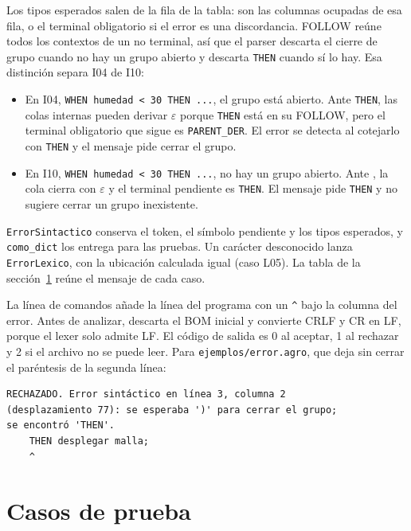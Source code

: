 \documentclass[11pt,a4paper]{article}
\newcommand{\tk}[1]{\texttt{#1}}
\begin{document}
Los tipos esperados salen de la fila de la tabla: son las columnas
ocupadas de esa fila, o el terminal obligatorio si el error es una
discordancia. FOLLOW reúne todos los contextos de un no terminal,
así que el parser descarta el cierre de grupo cuando no hay un
grupo abierto y descarta \tk{THEN} cuando sí lo hay. Esa distinción
separa I04 de I10:

\begin{itemize}
  \item En I04, \texttt{WHEN humedad < 30 THEN ...}, el grupo está
    abierto. Ante \tk{THEN}, las colas internas pueden derivar
    $\varepsilon$ porque \tk{THEN} está en su FOLLOW, pero el
    terminal obligatorio que sigue es \tk{PARENT\_DER}. El error
    se detecta al cotejarlo con \tk{THEN} y el mensaje pide cerrar el grupo.
  \item En I10, \texttt{WHEN humedad < 30 THEN ...}, no hay un grupo
    abierto. Ante \tk{}, la cola cierra con $\varepsilon$ y el
    terminal pendiente es \tk{THEN}. El mensaje pide \tk{THEN} y no
    sugiere cerrar un grupo inexistente.
\end{itemize}

\texttt{ErrorSintactico} conserva el token, el símbolo pendiente y
los tipos esperados, y \texttt{como\_dict} los entrega para las
pruebas. Un carácter desconocido lanza \texttt{ErrorLexico}, con la
ubicación calculada igual (caso L05). La tabla de la
sección~\ref{sec:casos} reúne el mensaje de cada caso.

La línea de comandos añade la línea del programa con un
\tk{\textasciicircum{}} bajo la columna del error. Antes de analizar,
descarta el BOM inicial y convierte CRLF y CR en LF, porque el lexer
solo admite LF. El código de salida es 0 al aceptar, 1 al rechazar y
2 si el archivo no se puede leer. Para \texttt{ejemplos/error.agro},
que deja sin cerrar el paréntesis de la segunda línea:

\begin{Verbatim}
RECHAZADO. Error sintáctico en línea 3, columna 2
(desplazamiento 77): se esperaba ')' para cerrar el grupo;
se encontró 'THEN'.
    THEN desplegar malla;
    ^
\end{Verbatim}

\section{Casos de prueba}
\label{sec:casos}
\end{document}
